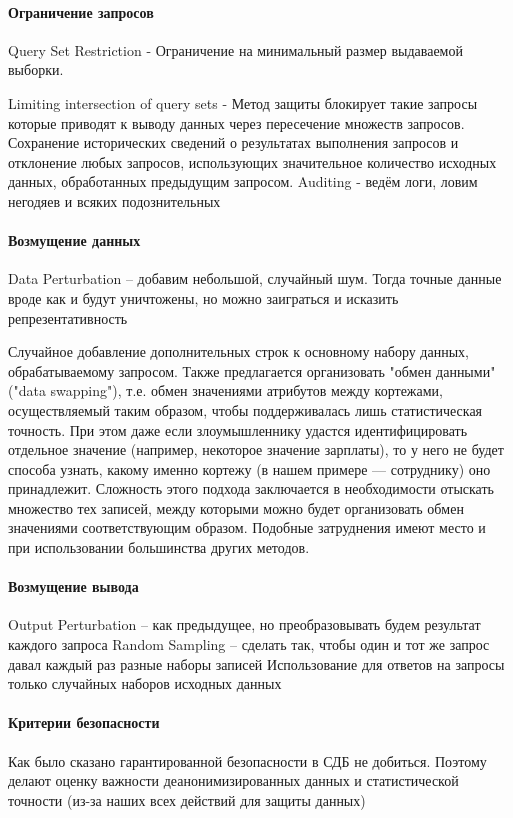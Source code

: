 \paragraph{Ограничение запросов}

Query Set Restriction - Ограничение на минимальный размер выдаваемой выборки.

Limiting intersection of query sets -  Метод защиты блокирует такие запросы которые приводят к выводу данных через пересечение множеств запросов.
Сохранение исторических сведений о результатах выполнения запросов и отклонение любых запросов, использующих значительное количество исходных данных, обработанных предыдущим запросом.
Auditing - ведём логи, ловим негодяев и всяких подознительных

\paragraph{Возмущение данных}

Data Perturbation -- добавим небольшой, случайный шум. Тогда точные данные вроде как и будут уничтожены, но можно заиграться и исказить репрезентативность

Случайное добавление дополнительных строк к основному набору данных, обрабатываемому запросом.
Также предлагается организовать "обмен данными" ("data swapping"), т.е. обмен значениями атрибутов между кортежами, осуществляемый таким образом, чтобы поддерживалась лишь статистическая точность. При этом даже если злоумышленнику удастся идентифицировать отдельное значение (например, некоторое значение зарплаты), то у него не будет способа узнать, какому именно кортежу (в нашем примере — сотруднику) оно принадлежит. Сложность этого подхода заключается в необходимости отыскать множество тех записей, между которыми можно будет организовать обмен значениями соответствующим образом. Подобные затруднения имеют место и при использовании большинства других методов.

\paragraph{Возмущение вывода}

Output Perturbation -- как предыдущее, но преобразовывать будем результат каждого запроса
Random Sampling -- сделать так, чтобы один и тот же запрос давал каждый раз разные наборы записей
Использование для ответов на запросы только случайных наборов исходных данных

\paragraph{Критерии безопасности}
Как было сказано гарантированной безопасности в СДБ не добиться. Поэтому делают оценку важности деанонимизированных данных и статистической точности (из-за наших всех действий для защиты данных)


